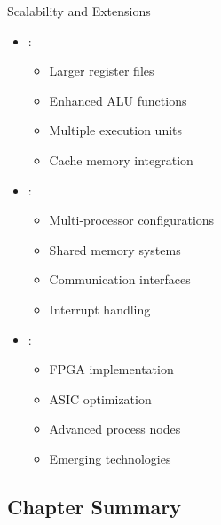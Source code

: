 \begin{frame}{Scalability and Extensions}
\begin{itemize}
\item {}:
\begin{itemize}
\item Larger register files
\item Enhanced ALU functions
\item Multiple execution units
\item Cache memory integration
\end{itemize}
\vspace{0.5cm}
\item {}:
\begin{itemize}
\item Multi-processor configurations
\item Shared memory systems
\item Communication interfaces
\item Interrupt handling
\end{itemize}
\vspace{0.3cm}
\item {}:
\begin{itemize}
\item FPGA implementation
\item ASIC optimization
\item Advanced process nodes
\item Emerging technologies
\end{itemize}
\end{itemize}
\end{frame}

\subsection{Chapter Summary}

